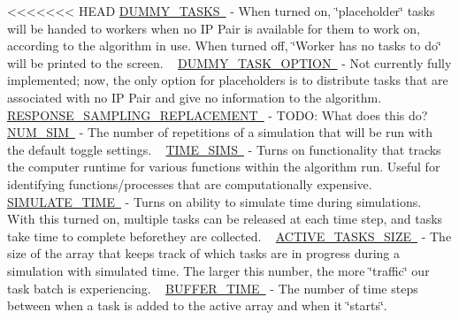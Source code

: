 <<<<<<< HEAD
\mbox{\hyperlink{namespacedynamicfilterapp_1_1toggles_a16edb4f07d82f0494347a0977663e6f4}{D\+U\+M\+M\+Y\+\_\+\+T\+A\+S\+KS }} -\/ When turned on, \char`\"{}placeholder\char`\"{} tasks will be handed to workers when no IP Pair is available for them to work on, according to the algorithm in use. When turned off, \char`\"{}\+Worker has no tasks to do\char`\"{} will be printed to the screen. ~\newline
 \mbox{\hyperlink{namespacedynamicfilterapp_1_1toggles_a0b87eab5c4f4f0b986a43805f825d2c6}{D\+U\+M\+M\+Y\+\_\+\+T\+A\+S\+K\+\_\+\+O\+P\+T\+I\+ON }} -\/ Not currently fully implemented; now, the only option for placeholders is to distribute tasks that are associated with no IP Pair and give no information to the algorithm. ~\newline
 \mbox{\hyperlink{namespacedynamicfilterapp_1_1toggles_a1f569cdee80dfd4d7a2d7a3f3aebc47f}{R\+E\+S\+P\+O\+N\+S\+E\+\_\+\+S\+A\+M\+P\+L\+I\+N\+G\+\_\+\+R\+E\+P\+L\+A\+C\+E\+M\+E\+NT }} -\/ T\+O\+DO\+: What does this do? ~\newline
 \mbox{\hyperlink{namespacedynamicfilterapp_1_1toggles_a3baf5565851cd87736238d8dddfc1106}{N\+U\+M\+\_\+\+S\+IM }} -\/ The number of repetitions of a simulation that will be run with the default toggle settings. ~\newline
 \mbox{\hyperlink{namespacedynamicfilterapp_1_1toggles_a3dd608f63971ae7536ce7be96396c510}{T\+I\+M\+E\+\_\+\+S\+I\+MS }} -\/ Turns on functionality that tracks the computer runtime for various functions within the algorithm run. Useful for identifying functions/processes that are computationally expensive. ~\newline
 \mbox{\hyperlink{namespacedynamicfilterapp_1_1toggles_af689b6dbf6a3a082bbfb9f6decf1a805}{S\+I\+M\+U\+L\+A\+T\+E\+\_\+\+T\+I\+ME }} -\/ Turns on ability to simulate time during simulations. With this turned on, multiple tasks can be released at each time step, and tasks take time to complete beforethey are collected. ~\newline
 \mbox{\hyperlink{namespacedynamicfilterapp_1_1toggles_a374727dba0574510b39c1e2871f69e48}{A\+C\+T\+I\+V\+E\+\_\+\+T\+A\+S\+K\+S\+\_\+\+S\+I\+ZE }} -\/ The size of the array that keeps track of which tasks are in progress during a simulation with simulated time. The larger this number, the more \char`\"{}traffic\char`\"{} our task batch is experiencing. ~\newline
 \mbox{\hyperlink{namespacedynamicfilterapp_1_1toggles_a04a9eab148403f1f27d44b38211aad04}{B\+U\+F\+F\+E\+R\+\_\+\+T\+I\+ME }} -\/ The number of time steps between when a task is added to the active array and when it \char`\"{}starts\char`\"{}. ~\newline
